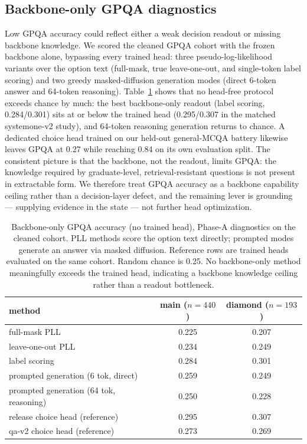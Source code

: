\documentclass[11pt]{article}
\begin{document}
\subsection{Backbone-only GPQA diagnostics}
\label{sec:backbone-diag}
Low GPQA accuracy could reflect either a weak decision readout or missing
backbone knowledge. We scored the cleaned GPQA cohort with the frozen
backbone alone, bypassing every trained head: three pseudo-log-likelihood
variants over the option text (full-mask, true leave-one-out, and
single-token label scoring) and two greedy masked-diffusion generation
modes (direct 6-token answer and 64-token reasoning).
Table~\ref{tab:backbone-diag} shows that no head-free protocol exceeds
chance by much: the best backbone-only readout (label scoring,
0.284/0.301) sits at or below the trained head (0.295/0.307 in the
matched systemone-v2 study), and 64-token reasoning generation returns
to chance. A dedicated choice head trained on our held-out
general-MCQA battery likewise leaves GPQA at 0.27 while reaching 0.84
on its own evaluation split. The consistent picture is that the
backbone, not the readout, limits GPQA: the knowledge required by
graduate-level, retrieval-resistant questions is not present in
extractable form. We therefore treat GPQA accuracy as a backbone
capability ceiling rather than a decision-layer defect, and the
remaining lever is grounding — supplying evidence in the state — not
further head optimization.

\begin{table}[htbp]
\centering\small
\begin{tabular}{lcc}
\toprule
method & main ($n{=}440$) & diamond ($n{=}193$) \\
\midrule
full-mask PLL            & 0.225 & 0.207 \\
leave-one-out PLL        & 0.234 & 0.249 \\
label scoring            & 0.284 & 0.301 \\
prompted generation (6 tok, direct)     & 0.259 & 0.249 \\
prompted generation (64 tok, reasoning) & 0.250 & 0.228 \\
\midrule
release choice head (reference)         & 0.295 & 0.307 \\
qa-v2 choice head (reference)           & 0.273 & 0.269 \\
\bottomrule
\end{tabular}
\caption{Backbone-only GPQA accuracy (no trained head), Phase-A
diagnostics on the cleaned cohort. PLL methods score the option text
directly; prompted modes generate an answer via masked diffusion.
Reference rows are trained heads evaluated on the same cohort.
Random chance is 0.25. No backbone-only method meaningfully exceeds
the trained head, indicating a backbone knowledge ceiling rather than
a readout bottleneck.}
\label{tab:backbone-diag}
\end{table}
\end{document}
